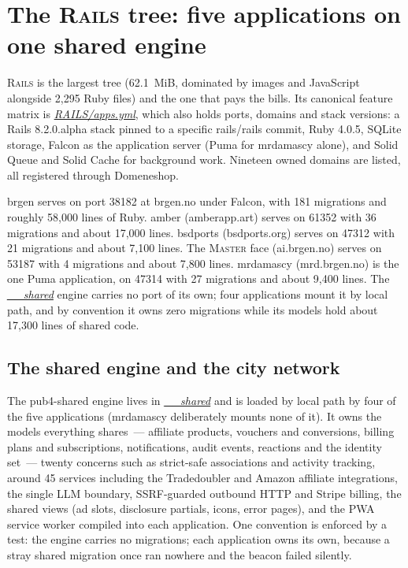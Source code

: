 \documentclass[oneside]{article}
\newcommand{\treename}[1]{\mbox{\textsc{#1}}}
\newcommand{\mtree}{\treename{Master}}
\newcommand{\rtree}{\treename{Rails}}
\newcommand{\fpath}[1]{\emph{\url{#1}}}
\begin{document}
\section{The \rtree{} tree: five applications on one shared engine}

\rtree{} is the largest tree (62.1~MiB, dominated by images and JavaScript alongside 2,295 Ruby files) and the one that pays the bills. Its canonical feature matrix is \fpath{RAILS/apps.yml}, which also holds ports, domains and stack versions: a Rails 8.2.0.alpha stack pinned to a specific rails/rails commit, Ruby 4.0.5, SQLite storage, Falcon as the application server (Puma for mrdamascy alone), and Solid Queue and Solid Cache for background work. Nineteen owned domains are listed, all registered through Domeneshop.

brgen serves on port 38182 at brgen.no under Falcon, with 181 migrations and roughly 58,000 lines of Ruby. amber (amberapp.art) serves on 61352 with 36 migrations and about 17,000 lines. bsdports (bsdports.org) serves on 47312 with 21 migrations and about 7,100 lines. The \mtree{} face (ai.brgen.no) serves on 53187 with 4 migrations and about 7,800 lines. mrdamascy (mrd.brgen.no) is the one Puma application, on 47314 with 27 migrations and about 9,400 lines. The \fpath{__shared} engine carries no port of its own; four applications mount it by local path, and by convention it owns zero migrations while its models hold about 17,300 lines of shared code.

\subsection{The shared engine and the city network}

The pub4-shared engine lives in \fpath{__shared} and is loaded by local path by four of the five applications (mrdamascy deliberately mounts none of it). It owns the models everything shares~--- affiliate products, vouchers and conversions, billing plans and subscriptions, notifications, audit events, reactions and the identity set~--- twenty concerns such as strict-safe associations and activity tracking, around 45 services including the Tradedoubler and Amazon affiliate integrations, the single LLM boundary, SSRF-guarded outbound HTTP and Stripe billing, the shared views (ad slots, disclosure partials, icons, error pages), and the PWA service worker compiled into each application. One convention is enforced by a test: the engine carries no migrations; each application owns its own, because a stray shared migration once ran nowhere and the beacon failed silently.
\end{document}
